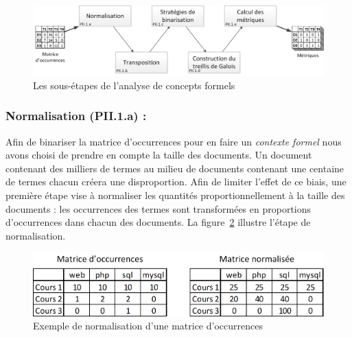 \begin{figure}[ht]
\centering
\centerline{  %
\includegraphics[scale=0.55]{3-Methode-CREA/images/schema_analyse_structurelle-ACF_ESCALIER.png}
}
\caption{Les sous-étapes de l'analyse de concepts formels}
\label{figure:3-II-1-ACF-Details}
\end{figure}


\subsubsection{Normalisation (PII.1.a) :}
\label{subsubsection:CREA:PII.1.a-normalisation}

Afin de binariser la matrice d'occurrences pour en faire un \textit{contexte formel}  nous avons choisi de prendre en compte la taille des documents.
Un document contenant des milliers de termes au milieu de documents contenant une centaine de termes chacun créera une disproportion.
Afin de limiter l'effet de ce biais, une première étape vise à normaliser les quantités proportionnellement à la taille des documents : les occurrences des termes sont transformées en proportions d'occurrences dans chacun des documents.
La figure~\ref{figure:3-II-1-a-Normalisation} illustre l'étape de normalisation.

\begin{figure}[ht]
\centering
\centerline{  %
\includegraphics[scale=1]{3-Methode-CREA/images/2-analyse-structurelle/exemple_normalisation.png}
}
\caption{Exemple de normalisation d'une matrice d'occurrences}
\label{figure:3-II-1-a-Normalisation}
\end{figure}

